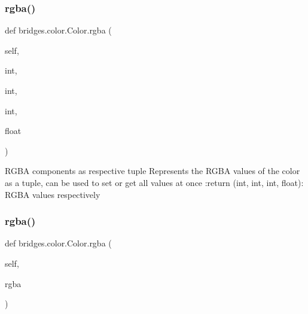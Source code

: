 \mbox{\label{classbridges_1_1color_1_1_color_a7653dfb80aa5ec25ed14314ffa79d1f2}} 
\subsubsection{\texorpdfstring{rgba()}{rgba()}\hspace{0.1cm}{\footnotesize\ttfamily [1/3]}}
{\footnotesize\ttfamily def bridges.\+color.\+Color.\+rgba (\begin{DoxyParamCaption}\item[{}]{self,  }\item[{}]{int,  }\item[{}]{int,  }\item[{}]{int,  }\item[{}]{float }\end{DoxyParamCaption})}

\begin{DoxyVerb}RGBA components as respective tuple
Represents the RGBA values of the color as a tuple, can be used to set or get all values at once
:return (int, int, int, float): RGBA values respectively
\end{DoxyVerb}
 \mbox{\label{classbridges_1_1color_1_1_color_aa3d8dcfea52715f28400b08bf15e94ab}} 
\subsubsection{\texorpdfstring{rgba()}{rgba()}\hspace{0.1cm}{\footnotesize\ttfamily [2/3]}}
{\footnotesize\ttfamily def bridges.\+color.\+Color.\+rgba (\begin{DoxyParamCaption}\item[{}]{self,  }\item[{}]{rgba }\end{DoxyParamCaption})}

\mbox{\label{classbridges_1_1color_1_1_color_a23f98340da1b581d67592e18317d08bc}} 
